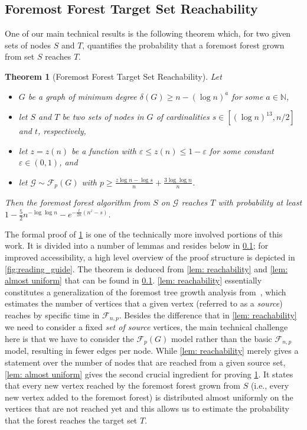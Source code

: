 \documentclass[a4paper,11pt]{article}
\theoremstyle{definition}
\theoremstyle{plain}
\newtheorem{theorem}{Theorem}
\newcommand{\NN}{\ensuremath{\mathbb{N}}}
\newcommand{\FFF}{\mathcal{F}}
\newcommand{\GGG}{\mathcal{G}}
\newcommand{\F}{\mathcal F}
\begin{document}
\subsection{Foremost Forest Target Set Reachability}
\label{app:general target set proof}

One of our main technical results is the following theorem which, for two given sets of nodes $S$ and $T$, quantifies the probability that a foremost forest grown from set $S$ reaches $T$.

\begin{theorem}[Foremost Forest Target Set Reachability]\label{theorem:general target set}
  Let
  \begin{itemize}
    \item $G$ be a graph of minimum degree $\delta(G)\ge n - (\log n)^a$ for some $a\in\NN$,
    \item let $S$ and $T$ be two sets of nodes in $G$ of cardinalities $s\in [(\log n)^{13}, n/2]$ and $t$, respectively,
    \item let $z=z(n)$ be a function with $\varepsilon\le z(n)\le 1 - \varepsilon$ for some constant $\varepsilon\in (0, 1)$, and
    \item let $\GGG\sim \FFF_{p}(G)$ with $p\ge \frac{z\log n -\log s}{n} +\frac{3\log\log n}{n}$.
  \end{itemize}
  Then the foremost forest algorithm from $S$ on $\GGG$ reaches
  $T$ with probability at least $1-\frac{5}{2}n^{-\log\log n} - e^{-\frac{t}{2n}(n^z-s)}$.
\end{theorem}

The formal proof of \cref{theorem:general target set} is one of the technically more involved portions of this work.
It is divided into a number of lemmas and resides below in \cref{app:general target set proof};
for improved accessibility, a high level overview of the proof structure is depicted in \cref{fig:reading_guide}. 
The theorem is deduced from \cref{lem: reachability} and \cref{lem: almost uniform} that can be found in \cref{app:general target set proof}. \cref{lem: reachability} essentially constitutes a generalization of the foremost tree growth analysis from~\cite{CasteigtsRRZ21}, which estimates the number of vertices that a given vertex (referred to as a \emph{source}) reaches by specific time in $\F_{n,p}$. Besides the difference that in \cref{lem: reachability} we need to consider a fixed \emph{set of source} vertices, the main technical challenge here is that we have to consider the $\F_p(G)$ model rather than the basic $\FFF_{n,p}$ model, resulting in fewer edges per node. While \cref{lem: reachability} merely gives a statement over the number of nodes that are reached from a given source set, \cref{lem: almost uniform} gives the second crucial ingredient for proving \cref{theorem:general target set}.  It states that every new vertex reached by the foremost forest grown from $S$ (i.e., every new vertex added to the foremost forest) is distributed almost uniformly on the vertices that are not reached yet and this allows us to estimate the probability that the forest reaches the target set $T$.
\end{document}
